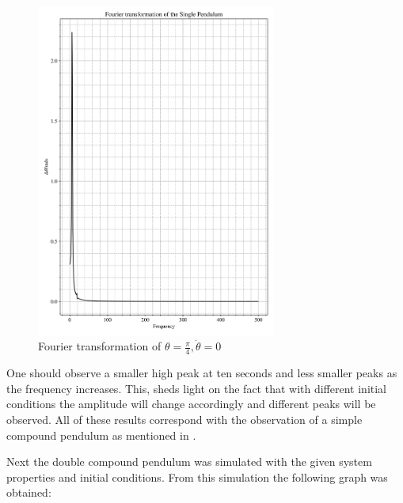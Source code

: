 \documentclass[12pt, a4paper]{article}
\begin{document}
\begin{figure}[H]
    \centering
    \includegraphics[width = 0.7\textwidth]{plots/Plot 2.5.png}\caption{Fourier transformation of \(\theta = \frac{\pi}{4}, \dot{\theta} = 0\)}\label{fig: fourier 1.2}
\end{figure}

One should observe a smaller high peak at ten seconds and less smaller peaks as the frequency increases. This, sheds light on the fact that with different initial conditions the amplitude will change accordingly and different peaks will be observed. All of these results correspond with the observation of a simple compound pendulum as mentioned in \cite{pedersen1977compound}. 

Next the double compound pendulum was simulated with the given system properties and initial conditions. From this simulation the following graph was obtained:
\end{document}
